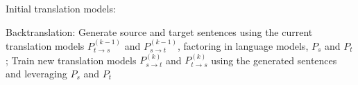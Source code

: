 Initial translation models: 

Backtranslation: Generate source and target sentences using the current
translation models ${P_{t\rightarrow s }^{(k-1)}}$ and ${P_{s \rightarrow t}^{(k-1)} }$, factoring in language models, ${P_s}$ and ${P_t}$;
Train new translation models ${P_{s\rightarrow t}^{(k)}}$ and ${P_{t \rightarrow s}^{(k)}}$ using the generated sentences and leveraging ${P_s}$ and ${P_t}$































